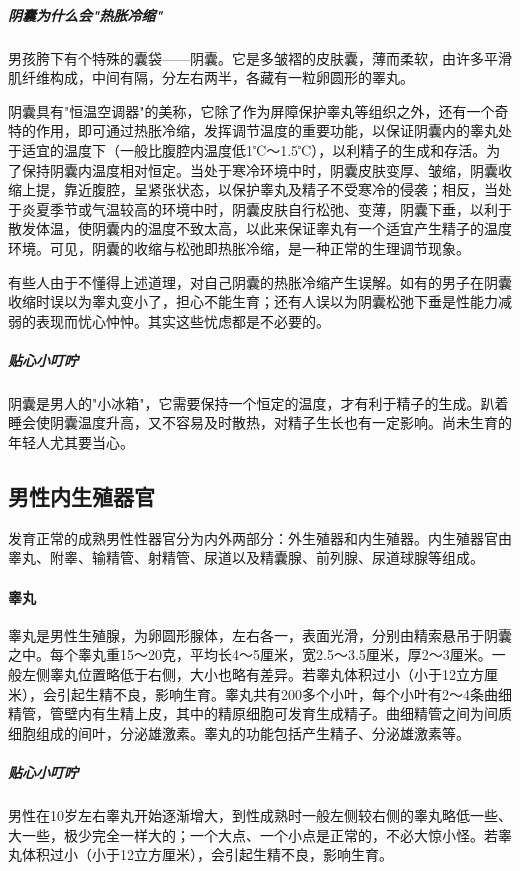 \subparagraph{阴囊为什么会"热胀冷缩"}

男孩胯下有个特殊的囊袋——阴囊。它是多皱褶的皮肤囊，薄而柔软，由许多平滑肌纤维构成，中间有隔，分左右两半，各藏有一粒卵圆形的睪丸。

阴囊具有"恒温空调器"的美称，它除了作为屏障保护睾丸等组织之外，还有一个奇特的作用，即可通过热胀冷缩，发挥调节温度的重要功能，以保证阴囊内的睾丸处于适宜的温度下（一般比腹腔内温度低1℃～1.5℃），以利精子的生成和存活。为了保持阴囊内温度相对恒定。当处于寒冷环境中时，阴囊皮肤变厚、皱缩，阴囊收缩上提，靠近腹腔，呈紧张状态，以保护睾丸及精子不受寒冷的侵袭；相反，当处于炎夏季节或气温较高的环境中时，阴囊皮肤自行松弛、变薄，阴囊下垂，以利于散发体温，使阴囊内的温度不致太高，以此来保证睾丸有一个适宜产生精子的温度环境。可见，阴囊的收缩与松弛即热胀冷缩，是一种正常的生理调节现象。

有些人由于不懂得上述道理，对自己阴囊的热胀冷缩产生误解。如有的男子在阴囊收缩时误以为睾丸变小了，担心不能生育；还有人误以为阴囊松弛下垂是性能力减弱的表现而忧心忡忡。其实这些忧虑都是不必要的。

\subparagraph{贴心小叮咛}

阴囊是男人的"小冰箱"，它需要保持一个恒定的温度，才有利于精子的生成。趴着睡会使阴囊温度升高，又不容易及时散热，对精子生长也有一定影响。尚未生育的年轻人尤其要当心。

\subsection{男性内生殖器官}

发育正常的成熟男性性器官分为内外两部分：外生殖器和内生殖器。内生殖器官由睾丸、附睾、输精管、射精管、尿道以及精囊腺、前列腺、尿道球腺等组成。

\paragraph{睾丸}

睾丸是男性生殖腺，为卵圆形腺体，左右各一，表面光滑，分别由精索悬吊于阴囊之中。每个睾丸重15～20克，平均长4～5厘米，宽2.5～3.5厘米，厚2～3厘米。一般左侧睾丸位置略低于右侧，大小也略有差异。若睾丸体积过小（小于12立方厘米），会引起生精不良，影响生育。睾丸共有200多个小叶，每个小叶有2～4条曲细精管，管壁内有生精上皮，其中的精原细胞可发育生成精子。曲细精管之间为间质细胞组成的间叶，分泌雄激素。睾丸的功能包括产生精子、分泌雄激素等。

\subparagraph{贴心小叮咛}

男性在10岁左右睾丸开始逐渐增大，到性成熟时一般左侧较右侧的睾丸略低一些、大一些，极少完全一样大的；一个大点、一个小点是正常的，不必大惊小怪。若睾丸体积过小（小于12立方厘米），会引起生精不良，影响生育。

